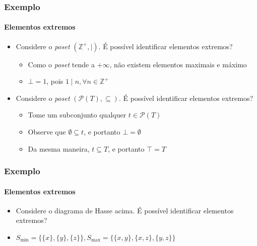 \documentclass[12pt]{beamer}
\begin{document}
\begin{frame}
  \frametitle{Exemplo}
  \framesubtitle{Elementos extremos}
  \begin{itemize}
    \item<1-> Considere o \emph{poset} $(\mathbb{Z}^{+}, \mid)$. É possível
        identificar elementos extremos?
    \begin{itemize}[itemsep=0pt]
      \item<2-> Como o \emph{poset} tende a $+\infty$, não existem elementos
          maximais e máximo
      \item<3-> $\bot = 1$, pois $1 \mid n, \forall n \in \mathbb{Z}^{+}$
    \end{itemize}
    \item<4-> Considere o \emph{poset} $(\mathcal{P}(T), \subseteq)$. É
        possível identificar elementos extremos?
    \begin{itemize}[itemsep=0pt]
      \item<5-> Tome um subconjunto qualquer $t \in \mathcal{P}(T)$
      \item<6-> Observe que $\emptyset \subseteq t$, e portanto $\bot =
          \emptyset$
      \item<7-> Da mesma maneira, $t \subseteq T$, e portanto $\top = T$
    \end{itemize}
  \end{itemize}
\end{frame}

\begin{frame}
  \frametitle{Exemplo}
  \framesubtitle{Elementos extremos}
  \centering
  \begin{itemize}
    \item<1-> Considere o diagrama de Hasse acima. É possível identificar
        elementos extremos?
    \item<2-> $S_{\min} = \{\{x\}, \{y\}, \{z\}\}, S_{\max} = \{\{x, y\}, \{x,
        z\}, \{y, z\}\}$
  \end{itemize}
\end{frame}
\end{document}
